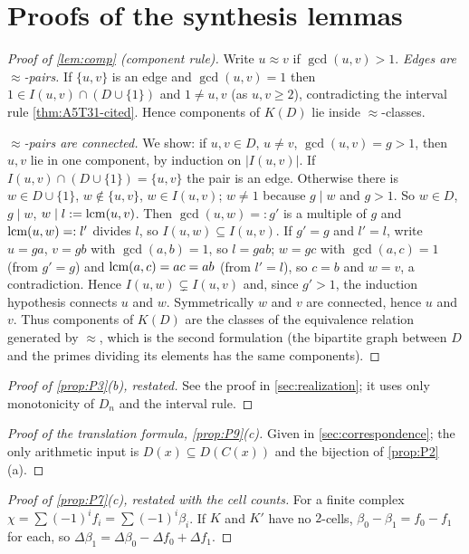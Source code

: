 \section{Proofs of the synthesis lemmas}\label{app:proofs}
\begin{proof}[Proof of \cref{lem:comp} (component rule)]
Write $u\approx v$ if $\gcd(u,v)>1$. \emph{Edges are $\approx$-pairs.} If $\{u,v\}$ is an edge and $\gcd(u,v)=1$ then $1\in I(u,v)\cap(D\cup\{1\})$ and $1\ne u,v$ (as $u,v\ge2$), contradicting the interval rule \cref{thm:A5T31-cited}. Hence components of $K(D)$ lie inside $\approx$-classes.

\emph{$\approx$-pairs are connected.} We show: if $u,v\in D$, $u\ne v$, $\gcd(u,v)=g>1$, then $u,v$ lie in one component, by induction on $|I(u,v)|$. If $I(u,v)\cap(D\cup\{1\})=\{u,v\}$ the pair is an edge. Otherwise there is $w\in D\cup\{1\}$, $w\notin\{u,v\}$, $w\in I(u,v)$; $w\ne1$ because $g\mid w$ and $g>1$. So $w\in D$, $g\mid w$, $w\mid l:=\operatorname{lcm}(u,v)$. Then $\gcd(u,w)=:g'$ is a multiple of $g$ and $\operatorname{lcm}(u,w)=:l'$ divides $l$, so $I(u,w)\subseteq I(u,v)$. If $g'=g$ and $l'=l$, write $u=ga$, $v=gb$ with $\gcd(a,b)=1$, so $l=gab$; $w=gc$ with $\gcd(a,c)=1$ (from $g'=g$) and $\operatorname{lcm}(a,c)=ac=ab$ (from $l'=l$), so $c=b$ and $w=v$, a contradiction. Hence $I(u,w)\subsetneq I(u,v)$ and, since $g'>1$, the induction hypothesis connects $u$ and $w$. Symmetrically $w$ and $v$ are connected, hence $u$ and $v$. Thus components of $K(D)$ are the classes of the equivalence relation generated by $\approx$, which is the second formulation (the bipartite graph between $D$ and the primes dividing its elements has the same components).\end{proof}
\begin{proof}[Proof of \cref{prop:P3}(b), restated] See the proof in \cref{sec:realization}; it uses only monotonicity of $D_n$ and the interval rule.\end{proof}
\begin{proof}[Proof of the translation formula, \cref{prop:P9}(c)] Given in \cref{sec:correspondence}; the only arithmetic input is $D(x)\subseteq D(C(x))$ and the bijection of \cref{prop:P2}(a).\end{proof}
\begin{proof}[Proof of \cref{prop:P7}(c), restated with the cell counts]
For a finite complex $\chi=\sum(-1)^if_i=\sum(-1)^i\beta_i$. If $K$ and $K'$ have no $2$-cells, $\beta_0-\beta_1=f_0-f_1$ for each, so $\Delta\beta_1=\Delta\beta_0-\Delta f_0+\Delta f_1$.\end{proof}
